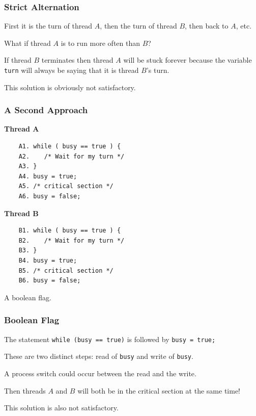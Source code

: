 \begin{frame}
\frametitle{Strict Alternation}

First it is the turn of thread $A$, then the turn of thread $B$, then back to $A$, etc. 

What if thread $A$ is to run more often than $B$? 

If thread $B$ terminates then thread $A$ will be stuck forever because the variable \texttt{turn} will always be saying that it is thread $B$'s turn. 

This solution is obviously not satisfactory.

\end{frame}

\begin{frame}[fragile]
\frametitle{A Second Approach}

\begin{multicols}{2}
\textbf{Thread A}
	\begin{verbatim}
	A1. while ( busy == true ) {
	A2.    /* Wait for my turn */
	A3. }
	A4. busy = true;
	A5. /* critical section */
	A6. busy = false;
	\end{verbatim}
\columnbreak
\textbf{Thread B}
	\begin{verbatim}
	B1. while ( busy == true ) {
	B2.    /* Wait for my turn */
	B3. }
	B4. busy = true;
	B5. /* critical section */
	B6. busy = false;
	\end{verbatim}
\end{multicols}

A boolean flag.

\end{frame}

\begin{frame}
\frametitle{Boolean Flag}

The statement \texttt{while (busy == true)} is followed by \texttt{busy = true;} 

These are two distinct steps: read of \texttt{busy} and write of \texttt{busy}.

A process switch could occur between the read and the write.

Then threads $A$ and $B$ will both be in the critical section at the same time! 

This solution is also not satisfactory.

\end{frame}

